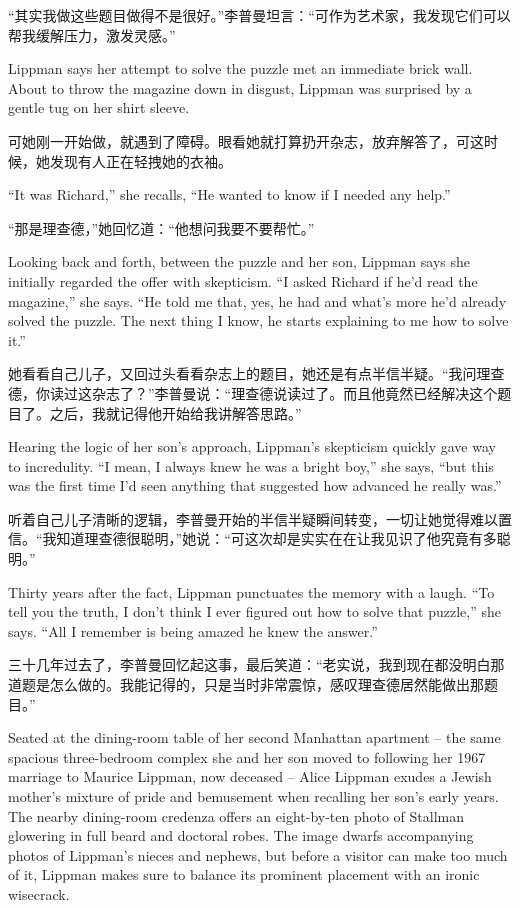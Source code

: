 \ifdefined\chs
“其实我做这些题目做得不是很好。”李普曼坦言：“可作为艺术家，我发现它们可以帮我缓解压力，激发灵感。”
\fi

\ifdefined\eng
Lippman says her attempt to solve the puzzle met an immediate brick wall. About to throw the magazine down in disgust, Lippman was surprised by a gentle tug on her shirt sleeve.
\fi

\ifdefined\chs
可她刚一开始做，就遇到了障碍。眼看她就打算扔开杂志，放弃解答了，可这时候，她发现有人正在轻拽她的衣袖。
\fi

\ifdefined\eng
``It was Richard,'' she recalls, ``He wanted to know if I needed any help.''
\fi

\ifdefined\chs
“那是理查德，”她回忆道：“他想问我要不要帮忙。”
\fi

\ifdefined\eng
Looking back and forth, between the puzzle and her son, Lippman says she initially regarded the offer with skepticism. ``I asked Richard if he'd read the magazine,'' she says. ``He told me that, yes, he had and what's more he'd already solved the puzzle. The next thing I know, he starts explaining to me how to solve it.''
\fi

\ifdefined\chs
她看看自己儿子，又回过头看看杂志上的题目，她还是有点半信半疑。“我问理查德，你读过这杂志了？”李普曼说：“理查德说读过了。而且他竟然已经解决这个题目了。之后，我就记得他开始给我讲解答思路。”
\fi

\ifdefined\eng
Hearing the logic of her son's approach, Lippman's skepticism quickly gave way to incredulity. ``I mean, I always knew he was a bright boy,'' she says, ``but this was the first time I'd seen anything that suggested how advanced he really was.''
\fi

\ifdefined\chs
听着自己儿子清晰的逻辑，李普曼开始的半信半疑瞬间转变，一切让她觉得难以置信。“我知道理查德很聪明，”她说：“可这次却是实实在在让我见识了他究竟有多聪明。”
\fi

\ifdefined\eng
Thirty years after the fact, Lippman punctuates the memory with a laugh. ``To tell you the truth, I don't think I ever figured out how to solve that puzzle,'' she says. ``All I remember is being amazed he knew the answer.''
\fi

\ifdefined\chs
三十几年过去了，李普曼回忆起这事，最后笑道：“老实说，我到现在都没明白那道题是怎么做的。我能记得的，只是当时非常震惊，感叹理查德居然能做出那题目。”
\fi

\ifdefined\eng
Seated at the dining-room table of her second Manhattan apartment -- the same spacious three-bedroom complex she and her son moved to following her 1967 marriage to Maurice Lippman, now deceased -- Alice Lippman exudes a Jewish mother's mixture of pride and bemusement when recalling her son's early years. The nearby dining-room credenza offers an eight-by-ten photo of Stallman glowering in full beard and doctoral robes. The image dwarfs accompanying photos of Lippman's nieces and nephews, but before a visitor can make too much of it, Lippman makes sure to balance its prominent placement with an ironic wisecrack.
\fi

